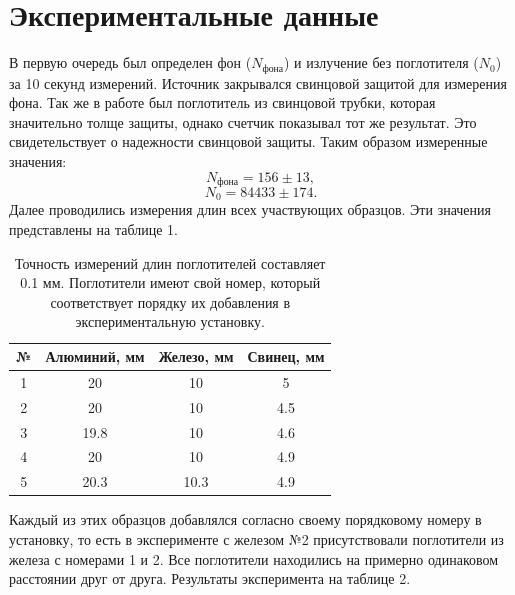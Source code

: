 \documentclass[a4paper, 14pt]{extarticle}%
\newcommand\ECaption[1]{%
     \captionsetup{font=footnotesize}%
     \caption{#1}}
\begin{document}
\section*{Экспериментальные данные}

В первую очередь был определен фон ($N_{\text{фона}}$) и излучение без поглотителя ($N_0$) за 10 секунд измерений. Источник закрывался свинцовой защитой для измерения фона. Так же в работе был поглотитель из свинцовой трубки, которая значительно толще защиты, однако счетчик показывал тот же результат. Это свидетельствует о надежности свинцовой защиты. Таким образом измеренные значения:
\[ N_{\text{фона}} = 156 \pm 13,\]
\[N_0 = 84433 \pm 174.\]
Далее проводились измерения длин всех участвующих образцов. Эти значения представлены на таблице 1.

\begin{table}[h!]
\begin{center}
\begin{tabular}{|c|c|c|c|}
\hline
\rowcolor[HTML]{9698ED} 
№  & Алюминий, мм & Железо, мм & Свинец, мм \\ \hline
1 & 20       & 10     & 5      \\ \hline
\rowcolor[HTML]{9698ED} 
2 & 20       & 10     & 4.5    \\ \hline
3 & 19.8     & 10     & 4.6    \\ \hline
\rowcolor[HTML]{9698ED} 
4 & 20       & 10     & 4.9    \\ \hline
5 & 20.3     & 10.3   & 4.9    \\ \hline
\end{tabular}
\ECaption{Точность измерений длин поглотителей составляет 0.1 мм. Поглотители имеют свой номер, который соответствует порядку их добавления в экспериментальную установку.}
\end{center}
\end{table}

Каждый из этих образцов добавлялся согласно своему порядковому номеру в установку, то есть в эксперименте с железом №2 присутствовали поглотители из железа с номерами 1 и 2. Все поглотители находились на примерно одинаковом расстоянии друг от друга. Результаты эксперимента на таблице 2.
\newpage
\end{document}
